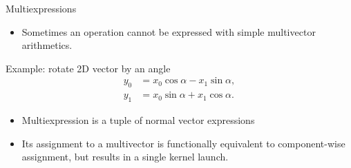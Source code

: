 \documentclass[@BEAMER_OPTIONS@]{beamer}
\begin{document}
\begin{frame}[fragile]{Multiexpressions}
    \begin{itemize}
        \item Sometimes an operation cannot be expressed with simple
            multivector arithmetics.
    \end{itemize}
    \begin{block}{Example: rotate 2D vector by an angle}
        \vspace{-1\baselineskip}
        \begin{align*}
            y_0 &= x_0 \cos \alpha - x_1 \sin \alpha, \\
            y_1 &= x_0 \sin \alpha + x_1 \cos \alpha.
        \end{align*}
    \end{block}

    \begin{itemize}
        \item Multiexpression is a tuple of normal vector expressions
        \item Its assignment to a multivector is functionally equivalent to
            component-wise assignment, but results in a single kernel launch.
    \end{itemize}
\end{frame}

\end{document}
